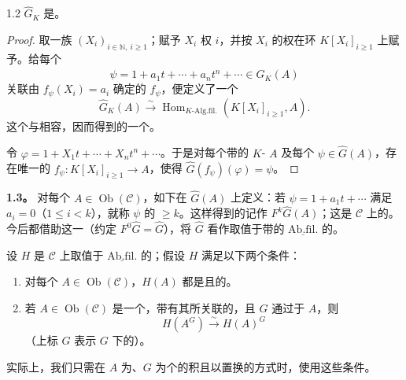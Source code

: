 \begin{SGAresult}{}{1.2}
 $\widehat G_K$ 是。
\end{SGAresult}
\begin{proof}
取一族 $(X_i)_{i\in\mathbb N,\ i\geqslant1}$；赋予 $X_i$ 权 $i$，并按 $X_i$ 的权在环 $K[X_i]_{i\geqslant1}$ 上赋予。给每个
\[
\psi=1+a_1t+\cdots+a_nt^n+\cdots\in\widehat G_K(A)
\]
关联由 $f_\psi(X_i)=a_i$ 确定的 $f_\psi$，便定义了一个
\[
\widehat G_K(A)\xrightarrow{\sim}
\operatorname{Hom}_{K\text{-}\mathrm{Alg.fil.}}(K[X_i]_{i\geqslant1},A).
\]
这个与相容，因而得到的一个。

令 $\varphi=1+X_1t+\cdots+X_nt^n+\cdots$。于是对每个带的 $K$- $A$ 及每个 $\psi\in\widehat G(A)$，存在唯一的
$f_\psi:K[X_i]_{i\geqslant1}\longrightarrow A$，使得 $\widehat G(f_\psi)(\varphi)=\psi$。
\end{proof}

\textbf{1.3。} 对每个 $A\in\operatorname{Ob}(\mathscr C)$，如下在 $\widehat G(A)$ 上定义：若 $\psi=1+a_1t+\cdots$ 满足 $a_i=0$（$1\leqslant i<k$），就称 $\psi$ 的 $\geqslant k$。这样得到的记作 $F^k\widehat G(A)$；这是 $\mathscr C$ 上的。今后都借助这一（约定 $F^0\widehat G=\widehat G$），将 $\widehat G$ 看作取值于带的 $\underline{\mathrm{Ab.fil.}}$ 的。

设 $H$ 是 $\mathscr C$ 上取值于 $\underline{\mathrm{Ab.fil.}}$ 的；假设 $H$ 满足以下两个条件：
\begin{enumerate}
\item[i)] 对每个 $A\in\operatorname{Ob}(\mathscr C)$，$H(A)$ 都是且的。
\item[ii)] 若 $A\in\operatorname{Ob}(\mathscr C)$ 是一个，带有其所关联的，且 $G$ 通过于 $A$，则
\[
H(A^G)\xrightarrow{\sim}H(A)^G
\]
（上标 $G$ 表示 $G$ 下的）。
\end{enumerate}
实际上，我们只需在 $A$ 为、$G$ 为个的积且以置换的方式时，使用这些条件。

